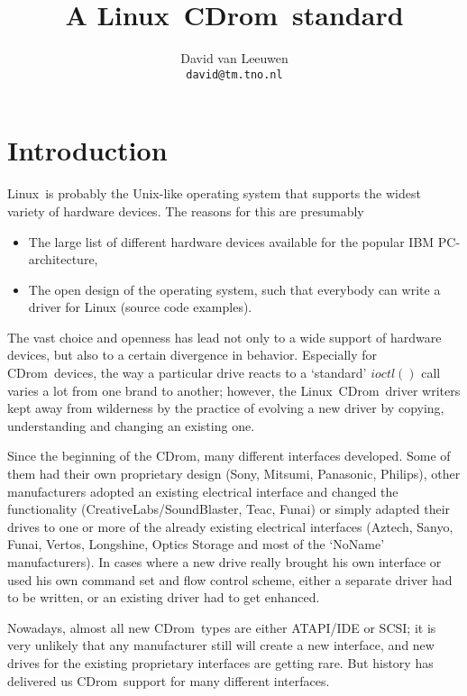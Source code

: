 \documentclass{article}
\def\linux{{\sc Linux}}
\def\cdrom{{\sc CDrom}}
\begin{document}
\title{A \linux\ \cdrom\ standard}
\author{David van Leeuwen\\{\normalsize\tt david@tm.tno.nl}}

\maketitle

\section{Introduction}

\linux\ is probably the Unix-like operating system that supports the widest
variety of hardware devices. The reasons for this are presumably
\begin{itemize}
\item The large list of different hardware devices available for the popular
IBM PC-architecture,
\item The open design of the operating system, such that everybody can
write a driver for Linux (source code examples).
\end{itemize}
The vast choice and openness has lead not only to a wide support of
hardware devices, but also to a certain divergence in behavior.
Especially for \cdrom\ devices, the way a particular drive reacts to a
`standard' $ioctl()$ call varies a lot from one brand to another;
however, the \linux\ \cdrom\ driver writers kept away from wilderness
by the practice of evolving a new driver by copying, understanding and
changing an existing one.

Since the beginning of the \cdrom, many different interfaces
developed.  Some of them had their own proprietary design (Sony,
Mitsumi, Panasonic, Philips), other manufacturers adopted an existing
electrical interface and changed the functionality
(CreativeLabs/SoundBlaster, Teac, Funai) or simply adapted their
drives to one or more of the already existing electrical interfaces
(Aztech, Sanyo, Funai, Vertos, Longshine, Optics Storage and most of
the `NoName' manufacturers).  In cases where a new drive really
brought his own interface or used his own command set and flow control
scheme, either a separate driver had to be written, or an existing
driver had to get enhanced.

Nowadays, almost all new \cdrom\ types are either ATAPI/IDE or SCSI;
it is very unlikely that any manufacturer still will create a new
interface, and new drives for the existing proprietary interfaces are
getting rare.  But history has delivered us \cdrom\ support for many
different interfaces.
\end{document}
